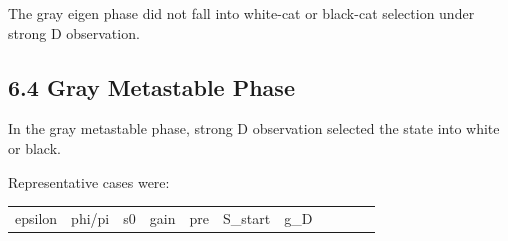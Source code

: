 \documentclass{article}
\newcounter{none}
\begin{document}
The gray eigen phase did not fall into white-cat or black-cat selection
under strong D observation.

\subsection{6.4 Gray Metastable Phase}\label{gray-metastable-phase}

In the gray metastable phase, strong D observation selected the state
into white or black.

Representative cases were:

{\def\LTcaptype{none} %
\begin{longtable}[]{@{}
  >{\raggedleft\arraybackslash}p{}
  >{\raggedleft\arraybackslash}p{}
  >{\raggedleft\arraybackslash}p{}
  >{\raggedleft\arraybackslash}p{}
  >{\raggedleft\arraybackslash}p{}
  >{\raggedleft\arraybackslash}p{}
  >{\raggedleft\arraybackslash}p{}
  >{\raggedleft\arraybackslash}p{}
  >{\raggedright\arraybackslash}p{}
  >{\raggedright\arraybackslash}p{}
  >{\raggedleft\arraybackslash}p{}@{}}
\toprule\noalign{}
\begin{minipage}[b]{\linewidth}\raggedleft
epsilon
\end{minipage} & \begin{minipage}[b]{\linewidth}\raggedleft
phi/pi
\end{minipage} & \begin{minipage}[b]{\linewidth}\raggedleft
s0
\end{minipage} & \begin{minipage}[b]{\linewidth}\raggedleft
gain
\end{minipage} & \begin{minipage}[b]{\linewidth}\raggedleft
pre
\end{minipage} & \begin{minipage}[b]{\linewidth}\raggedleft
S\_start
\end{minipage} & \begin{minipage}[b]{\linewidth}\raggedleft
g\_D
\end{minipage} & \begin{minipage}[b]{\linewidth}\raggedleft

\end{minipage}
\end{longtable}}
\end{document}
